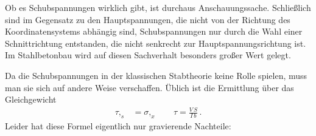 Ob es Schubspannungen wirklich gibt, ist durchaus Anschauungssache. Schlie{\ss}lich sind im Gegensatz zu den Hauptspannungen, die nicht von der Richtung des Koordinatensystems abh\"{a}ngig sind, Schubspannungen nur durch die Wahl einer Schnittrichtung entstanden, die nicht senkrecht zur Hauptspannungsrichtung ist. Im Stahlbetonbau wird auf diesen Sachverhalt besonders gro{\ss}er Wert gelegt.

Da die Schubspannungen in der klassischen Stabtheorie keine Rolle spielen, muss man sie sich auf andere Weise verschaffen. \"{U}blich ist die Ermittlung \"{u}ber das Gleichgewicht
\begin{align}
\tau,_s &=  \sigma,_x \qquad
\tau = \frac{V\,S}{I\,b}\,.
\end{align}
Leider hat diese Formel eigentlich nur gravierende Nachteile:\\

